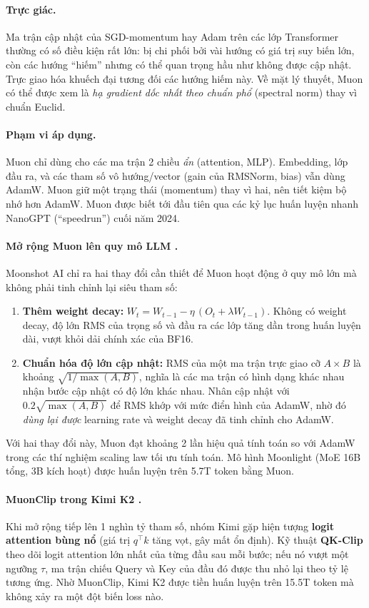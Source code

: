 \paragraph{Trực giác.} Ma trận cập nhật của SGD-momentum hay Adam trên các lớp Transformer thường có số điều kiện rất lớn: bị chi phối bởi vài hướng có giá trị suy biến lớn, còn các hướng “hiếm” nhưng có thể quan trọng hầu như không được cập nhật. Trực giao hóa khuếch đại tương đối các hướng hiếm này. Về mặt lý thuyết, Muon có thể được xem là \emph{hạ gradient dốc nhất theo chuẩn phổ} (spectral norm) thay vì chuẩn Euclid.

\paragraph{Phạm vi áp dụng.} Muon chỉ dùng cho các ma trận 2 chiều \emph{ẩn} (attention, MLP). Embedding, lớp đầu ra, và các tham số vô hướng/vector (gain của RMSNorm, bias) vẫn dùng AdamW. Muon giữ một trạng thái (momentum) thay vì hai, nên tiết kiệm bộ nhớ hơn AdamW. Muon được biết tới đầu tiên qua các kỷ lục huấn luyện nhanh NanoGPT (“speedrun”) cuối năm 2024.

\paragraph{Mở rộng Muon lên quy mô LLM \cite{liu2025muon}.} Moonshot AI chỉ ra hai thay đổi cần thiết để Muon hoạt động ở quy mô lớn mà không phải tinh chỉnh lại siêu tham số:
\begin{enumerate}
	\item \textbf{Thêm weight decay:} $W_t = W_{t-1} - \eta\,(O_t + \lambda W_{t-1})$. Không có weight decay, độ lớn RMS của trọng số và đầu ra các lớp tăng dần trong huấn luyện dài, vượt khỏi dải chính xác của BF16.
	\item \textbf{Chuẩn hóa độ lớn cập nhật:} RMS của một ma trận trực giao cỡ $A\times B$ là khoảng $\sqrt{1/\max(A,B)}$, nghĩa là các ma trận có hình dạng khác nhau nhận bước cập nhật có độ lớn khác nhau. Nhân cập nhật với $0.2\sqrt{\max(A,B)}$ để RMS khớp với mức điển hình của AdamW, nhờ đó \emph{dùng lại được} learning rate và weight decay đã tinh chỉnh cho AdamW.
\end{enumerate}
Với hai thay đổi này, Muon đạt khoảng 2 lần hiệu quả tính toán so với AdamW trong các thí nghiệm scaling law tối ưu tính toán. Mô hình Moonlight (MoE 16B tổng, 3B kích hoạt) được huấn luyện trên 5.7T token bằng Muon.

\paragraph{MuonClip trong Kimi K2 \cite{kimiteam2025k2}.} Khi mở rộng tiếp lên 1 nghìn tỷ tham số, nhóm Kimi gặp hiện tượng \textbf{logit attention bùng nổ} (giá trị $q^\top k$ tăng vọt, gây mất ổn định). Kỹ thuật \textbf{QK-Clip} theo dõi logit attention lớn nhất của từng đầu sau mỗi bước; nếu nó vượt một ngưỡng $\tau$, ma trận chiếu Query và Key của đầu đó được thu nhỏ lại theo tỷ lệ tương ứng. Nhờ MuonClip, Kimi K2 được tiền huấn luyện trên 15.5T token mà không xảy ra một đột biến loss nào.


